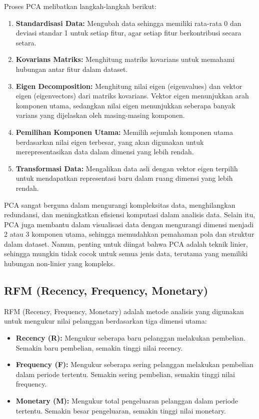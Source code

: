 Proses PCA melibatkan langkah-langkah berikut:
\begin{enumerate}
    \item \textbf{Standardisasi Data:} Mengubah data sehingga memiliki rata-rata 0 dan deviasi standar 1 untuk setiap fitur, agar setiap fitur berkontribusi secara setara.
    \item \textbf{Kovarians Matriks:} Menghitung matriks kovarians untuk memahami hubungan antar fitur dalam dataset.
    \item \textbf{Eigen Decomposition:} Menghitung nilai eigen (eigenvalues) dan vektor eigen (eigenvectors) dari matriks kovarians. Vektor eigen menunjukkan arah komponen utama, sedangkan nilai eigen menunjukkan seberapa banyak varians yang dijelaskan oleh masing-masing komponen.
    \item \textbf{Pemilihan Komponen Utama:} Memilih sejumlah komponen utama berdasarkan nilai eigen terbesar, yang akan digunakan untuk merepresentasikan data dalam dimensi yang lebih rendah.
    \item \textbf{Transformasi Data:} Mengalikan data asli dengan vektor eigen terpilih untuk mendapatkan representasi baru dalam ruang dimensi yang lebih rendah.
\end{enumerate}

PCA sangat berguna dalam mengurangi kompleksitas data, menghilangkan redundansi, dan meningkatkan efisiensi komputasi dalam analisis data. Selain itu, PCA juga membantu dalam visualisasi data dengan mengurangi dimensi menjadi 2 atau 3 komponen utama, sehingga memudahkan pemahaman pola dan struktur dalam dataset. Namun, penting untuk diingat bahwa PCA adalah teknik linier, sehingga mungkin tidak cocok untuk semua jenis data, terutama yang memiliki hubungan non-linier yang kompleks.

\subsection{RFM (Recency, Frequency, Monetary)}
RFM (Recency, Frequency, Monetary) adalah metode analisis yang digunakan untuk mengukur nilai pelanggan berdasarkan tiga dimensi utama:

\begin{itemize}
    \item \textbf{Recency (R):} Mengukur seberapa baru pelanggan melakukan pembelian. Semakin baru pembelian, semakin tinggi nilai recency.
    \item \textbf{Frequency (F):} Mengukur seberapa sering pelanggan melakukan pembelian dalam periode tertentu. Semakin sering pembelian, semakin tinggi nilai frequency.
    \item \textbf{Monetary (M):} Mengukur total pengeluaran pelanggan dalam periode tertentu. Semakin besar pengeluaran, semakin tinggi nilai monetary.
\end{itemize}





